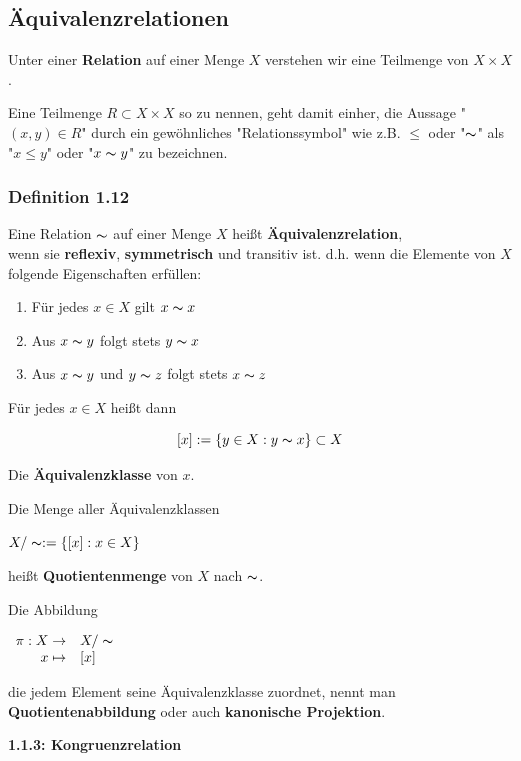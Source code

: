 \documentclass{scrartcl}
\begin{document}
\subsection{Äquivalenzrelationen}

Unter einer \textbf{Relation} auf einer Menge $X$ verstehen wir eine Teilmenge von $X \times X$.

Eine Teilmenge $R \subset X \times X$ so zu nennen, geht damit einher, die Aussage "$(x,y)\in R$" durch ein gewöhnliches "Relationssymbol" wie z.B. $\leq$ oder "$\thicksim$" als "$x \leq y$" oder "$x \thicksim y$" zu bezeichnen.

\subsubsection{Definition 1.12}

Eine Relation $\thicksim$ auf einer Menge $X$ heißt \textbf{Äquivalenzrelation}, \\
wenn sie \textbf{reflexiv}, \textbf{symmetrisch} und transitiv ist. d.h. wenn die Elemente von $X$ folgende Eigenschaften erfüllen:

\begin{enumerate}
 \item Für jedes $x \in X$ gilt $x \thicksim x$
 \item Aus $x \thicksim y$ folgt stets $y \thicksim x$
 \item Aus $x \thicksim y$ und $y \thicksim z$ folgt stets $x \thicksim z$
\end{enumerate}

Für jedes $x\in X$ heißt dann

\[[x]:= \{y \in X:y \thicksim x\} \subset X\]

Die \textbf{Äquivalenzklasse} von $x$.

Die Menge aller Äquivalenzklassen

$X/\thicksim := \{[x]:x \in X\}$

heißt \textbf{Quotientenmenge} von $X$ nach $\thicksim$. 

Die Abbildung 

$\begin{array}{rl}
    \pi: X \to & X/\thicksim \\
    x \mapsto  & [x]
\end{array}$

die jedem Element seine Äquivalenzklasse zuordnet, nennt man \textbf{Quotientenabbildung} oder auch \textbf{kanonische Projektion}.

\textbf{1.1.3: Kongruenzrelation}
\end{document}
